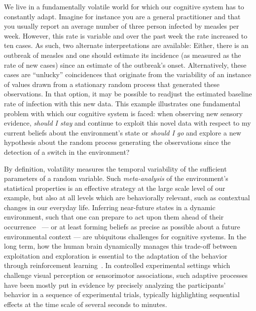 \documentclass[12pt,english]{article}%
\newcommand{\citep}[1]{\parencite{#1}}
\newcommand{\AM}[1]{\textbf{\textcolor{blue}{[AM: #1]}}}
\begin{document}
We live in a fundamentally volatile world for which
our cognitive system has to constantly adapt.
Imagine for instance you are a general practitioner and
that you usually report an average number of
three person infected by measles per week.
However, this rate is variable and
over the past week
the rate increased to ten cases.
As such, two alternate interpretations are available:
Either, there is an outbreak of measles and
one should estimate its incidence
(as measured as the rate of new cases)
since an estimate of the outbreak's onset.
Alternatively, these cases are
``unlucky'' coincidences that originate from the variability
of an instance of values drawn from a stationary random process
that generated these observations.
In that option, it may be possible to readjust
the estimated baseline rate of infection with this new data.
This example illustrates one fundamental problem
with which our cognitive system is faced:
when observing new sensory evidence,
\emph{should I stay} and continue to exploit this novel data
with respect to my current beliefs about the environment's state
or \emph{should I go} and explore a new hypothesis
about the random process generating the observations
since the detection of a switch in the environment?

By definition, volatility measures the temporal variability
of the sufficient parameters of a random variable.
Such \emph{meta-analysis} of the environment's statistical properties 
is an effective strategy at the large scale level of our example,
but also at all levels which are behaviorally relevant,
such as contextual changes in our everyday life.
Inferring near-future states in a dynamic environment, 
such that one can prepare to act upon them 
ahead of their occurrence~\citep{PerrinetAdamasFriston2014} ---
or at least forming beliefs as precise as possible
about a future environmental context ---
are ubiquitous challenges for cognitive systems.
In the long term, how the human brain dynamically manages
this trade-off between exploitation and exploration
is essential to the adaptation
of the behavior through reinforcement learning~\citep{Cohen2007}.
In controlled experimental settings which challenge visual perception or sensorimotor associations,
such adaptive processes have been mostly put in evidence
by precisely analyzing the participants' behavior in a sequence of experimental trials,
typically highlighting sequential effects
at the time scale of several seconds to minutes.
\end{document}
